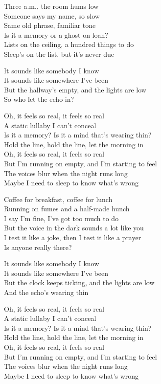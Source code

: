 \begin{lyrics}
Three a.m., the room hums low\\
Someone says my name, so slow\\
Same old phrase, familiar tone\\
Is it a memory or a ghost on loan?\\
Lists on the ceiling, a hundred things to do\\
Sleep’s on the list, but it’s never due

It sounds like somebody I know\\
It sounds like somewhere I’ve been\\
But the hallway’s empty, and the lights are low\\
So who let the echo in?

Oh, it feels so real, it feels so real\\
A static lullaby I can’t conceal\\
Is it a memory? Is it a mind that’s wearing thin?\\
Hold the line, hold the line, let the morning in\\
Oh, it feels so real, it feels so real\\
But I’m running on empty, and I’m starting to feel\\
The voices blur when the night runs long\\
Maybe I need to sleep to know what’s wrong

Coffee for breakfast, coffee for lunch\\
Running on fumes and a half-made hunch\\
I say I’m fine, I’ve got too much to do\\
But the voice in the dark sounds a lot like you\\
I test it like a joke, then I test it like a prayer\\
Is anyone really there?

It sounds like somebody I know\\
It sounds like somewhere I’ve been\\
But the clock keeps ticking, and the lights are low\\
And the echo’s wearing thin

Oh, it feels so real, it feels so real\\
A static lullaby I can’t conceal\\
Is it a memory? Is it a mind that’s wearing thin?\\
Hold the line, hold the line, let the morning in\\
Oh, it feels so real, it feels so real\\
But I’m running on empty, and I’m starting to feel\\
The voices blur when the night runs long\\
Maybe I need to sleep to know what’s wrong


\end{lyrics}
